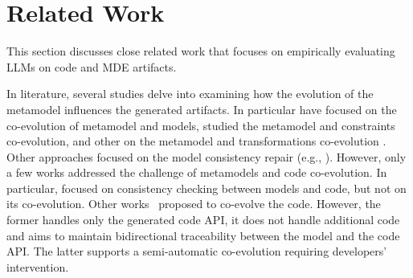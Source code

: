 \section{Related Work}
\label{RelatedWork}

This section discusses close related work that focuses on empirically evaluating LLMs on code and MDE artifacts. %


In literature, several studies delve into examining how the evolution of the metamodel influences the generated artifacts. In particular
\cite{kessentini2018integrating,kessentini2019automated,cicchetti2008automating,herrmannsdoerfer2009cope,garces2009managing,wachsmuth2007metamodel} have focused on the co-evolution of metamodel and models, \cite{batot2017heuristic,khelladi2017semi,correa2007refactoring,kusel2015systematic} studied the metamodel and constraints co-evolution, and other on the metamodel and transformations co-evolution \cite{kessentini2018automated,khelladi2018change,garces2014adapting,garcia2013model,kusel2015consistent}. Other approaches focused on the model consistency repair (e.g., \cite{kretschmer2017abstract,kretschmer2021consistent,kretschmer2021transforming,macedo2013model,pinna2015resolving}).  
However, only a few works addressed the challenge of metamodels and code co-evolution. 
In particular, \cite{riedl2014towards,kanakis2019empirical,pham2017bidirectional,jongeling2020towards,jongeling2022Structural,zaheri2021towards} focused on consistency checking between models and code, but not on its co-evolution. %
Other works~\cite{yu2012maintaining,Khelladi2020} proposed to co-evolve the code. However, the former handles only the generated code API, it does not handle additional code and aims to maintain bidirectional traceability between the model and the code API. The latter supports a semi-automatic co-evolution requiring developers' intervention. %


